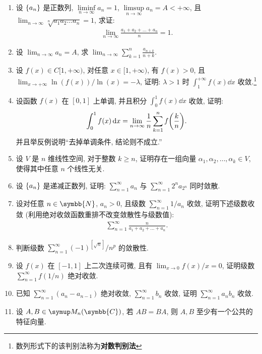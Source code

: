\documentclass{ctexart}
\let\set\qty
\let\emph\textbf
\let\ge\geqslant
\newcommand{\limit}[2]{\lim_{#1 \to #2}}
\newcommand{\N}{\ensuremath{\symbb{N}}}
\newcommand{\C}{\ensuremath{\symbb{C}}}
\begin{document}
\begin{enumerate}[series=exer]
    \item 设 $ \set{a_{n}} $ 是正数列, $ \liminf\limits_{n\to\infty} a_{n} = 1 $, $ \limsup\limits_{n\to\infty} a_{n} = A < +\infty $, 且 $ \limit{n}{\infty} \sqrt[n]{a_{1}a_{2}\dots a_{n}} = 1 $, 求证:
    \begin{align*}
        \limit{n}{\infty}\frac{a_{1} + a_{2} + \dots + a_{n}}{n} = 1.
    \end{align*}
    \item 设 $ \limit{n}{\infty} a_{n} = A $, 求 $ \limit{n}{\infty} \sum_{k=1}^{n} \frac{a_{n+k}}{n+k} $.  
    \item 设 $ f(x) \in C[1, +\infty) $, 对任意 $ x\in [1, +\infty) $, 有 $ f(x) > 0 $, 且 $ \limit{x}{+\infty} \ln(f(x))/\ln(x) = -\lambda $, 证明: $ \lambda > 1 $ 时 $ \int_{1}^{+\infty} f(x) \dd{x} $ 收敛.\footnote{数列形式下的该判别法称为\emph{对数判别法}}
    \item 设函数 $ f(x) $ 在 $ [0, 1] $ 上单调, 并且积分 $ \int_{0}^{1} f(x) \dd{x} $ 收敛, 证明:
    \begin{align*}
        \int_{0}^{1} f(x) \dd{x} = \limit{n}{\infty} \frac{1}{n} \sum_{k=1}^{n} f\qty(\frac{k}{n}).
    \end{align*}
    并且举反例说明``去掉单调条件, 结论则不成立.''
    \item 设 $ V $ 是 $ n $ 维线性空间, 对于整数 $ k \ge n $, 证明存在一组向量 $ \alpha_{1}, \alpha_{2}, \dots, \alpha_{k} \in V $, 使得其中任意 $ n $ 个线性无关.
    \item 设 $ \set{a_{n}} $ 是递减正数列, 证明: $ \sum_{n=1}^{\infty}a_{n} $ 与 $ \sum_{n=1}^{\infty}2^{n}a_{2^{n}} $ 同时敛散.
    \item 设对任意 $ n\in \N $, $ a_{n} > 0 $, 且级数 $ \sum_{n=1}^{\infty}1/a_{n} $ 收敛, 证明下述级数收敛 (利用绝对收敛函数重排不改变敛散性与级数值):
    \begin{align*}
        \sum_{n=1}^{\infty}\frac{n}{a_{1} + a_{2} + \dots + a_{n}}.
    \end{align*}
    \item 判断级数 $ \sum_{n=1}^{\infty} (-1)^{[\sqrt{n}]}/n^{p} $ 的敛散性.
    \item 设 $ f(x) $ 在 $ [-1, 1] $ 上二次连续可微, 且有 $ \limit{x}{0} f(x)/x = 0 $, 证明级数 $ \sum_{n=1}^{\infty}f(1/n) $ 绝对收敛.
    \item 已知 $ \sum_{n=1}^{\infty}(a_{n} - a_{n-1}) $ 绝对收敛, $ \sum_{n=1}^{\infty}b_{n} $ 收敛, 证明 $ \sum_{n=1}^{\infty}a_{n}b_{n} $ 收敛.
    \item 设 $ A, B \in \MM[\C] $, 若 $ AB = BA $, 则 $ A, B $ 至少有一个公共的特征向量. 

\end{enumerate}
\end{document}
